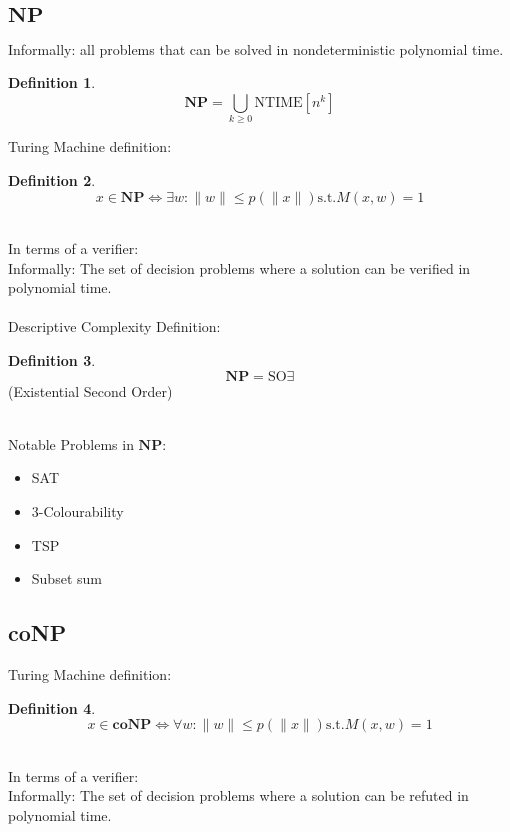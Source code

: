 \documentclass[]{article}
\theoremstyle{definition}
\newtheorem{definition}{Definition}[section]
\begin{document}
\subsection{$\mathbf{NP}$}
\label{sec:NP}
Informally: all problems that can be solved in nondeterministic polynomial time.
\begin{definition}
	$$\mathbf{NP} = \bigcup_{k\geq 0} \hyperref[sec:NTIME]{\text{NTIME}}[n^{k}]$$
\end{definition}
$ $
\\
Turing Machine definition:
\begin{definition}
	$$x \in \mathbf{NP}\iff \exists w : \|w\| \leq p(\|x\|) \text{s.t.} M(x, w) = 1$$
\end{definition}
$ $
\\
\\
In terms of a verifier:
\\
Informally: The set of decision problems where a solution can be verified in polynomial time.
\\
\\
Descriptive Complexity Definition:
\begin{definition}
	$$\mathbf{NP} = \text{SO}\exists$$
	(Existential Second Order)
\end{definition}
$ $
\\
\\
Notable Problems in $\mathbf{NP}$:
\begin{itemize}
	\item SAT
	\item 3-Colourability
	\item TSP
	\item Subset sum
\end{itemize}
\subsection{coNP}
\label{sec:coNP}
Turing Machine definition:
\begin{definition}
	$$x \in \mathbf{coNP}\iff \forall w : \|w\| \leq p(\|x\|) \text{s.t.} M(x, w) = 1$$
\end{definition}
$ $
\\
\\
In terms of a verifier:
\\
Informally: The set of decision problems where a solution can be refuted in polynomial time.
\end{document}
